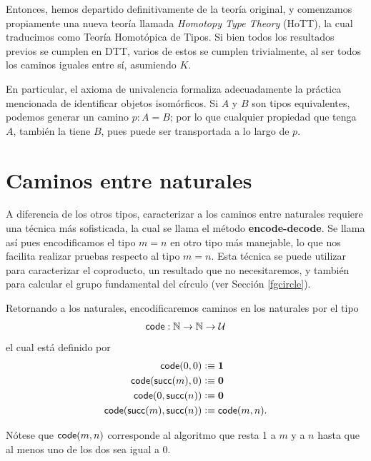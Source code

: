\documentclass[../main.tex]{subfiles}
\begin{document}
Entonces, hemos departido definitivamente de la teor\'ia original, y comenzamos propiamente una nueva teor\'ia llamada \textit{Homotopy Type Theory} (HoTT), la cual traducimos como Teor\'ia Homot\'opica de Tipos. Si bien todos los resultados previos se cumplen en DTT, varios de estos se cumplen trivialmente, al ser todos los caminos iguales entre s\'i, asumiendo $K$.

En particular, el axioma de univalencia formaliza adecuadamente la pr\'actica mencionada de identificar objetos isom\'orficos. Si $A$ y $B$ son tipos equivalentes, podemos generar un camino $p:A=B$; por lo que cualquier propiedad que tenga $A$, también la tiene $B$, pues puede ser transportada a lo largo de $p$.

\section{Caminos entre naturales}\label{natpaths}
A diferencia de los otros tipos, caracterizar a los caminos entre naturales requiere una t\'ecnica m\'as sofisticada, la cual se llama el m\'etodo \textbf{encode-decode}.
Se llama as\'i pues encodificamos el tipo $m = n$ en otro tipo m\'as manejable, lo que nos facilita realizar pruebas respecto al tipo $m=n$.
Esta t\'ecnica se puede utilizar para caracterizar el coproducto, un resultado que no necesitaremos, y tambi\'en para calcular el grupo fundamental del c\'irculo (ver Secci\'on \ref{fgcircle}).

Retornando a los naturales, encodificaremos caminos en los naturales por el tipo
\[ \mathsf{code} : \mathbb{N} \to \mathbb{N} \to \mathcal{U} \]
el cual est\'a definido por
\begin{align*}
  \mathsf{code}(0,0)             & \vcentcolon\equiv \mathbf{1}       \\
  \mathsf{code}(\mathsf{succ}(m),0)       & \vcentcolon\equiv \mathbf{0}     \\
  \mathsf{code}(0,\mathsf{succ}(n))       & \vcentcolon\equiv \mathbf{0}     \\
  \mathsf{code}(\mathsf{succ}(m),\mathsf{succ}(n)) & \vcentcolon\equiv \mathsf{code}(m,n).
\end{align*}

N\'otese que $\mathsf{code}(m,n)$ corresponde al algoritmo que resta 1 a $m$ y a $n$ hasta que al menos uno de los dos sea igual a 0.
\end{document}
